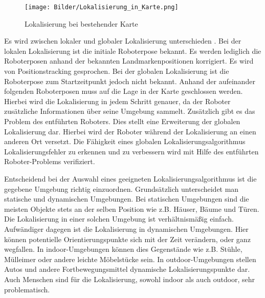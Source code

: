 \begin{figure}
	\centering
	\texttt{[image: Bilder/Lokalisierung\_in\_Karte.png]}
	\caption{Lokalisierung bei bestehender Karte}
	\label{fig:Lokalisierung}
\end{figure}

Es wird zwischen lokaler und globaler Lokalisierung unterschieden \cite{thrun2005}. Bei der lokalen Lokalisierung ist die initiale Roboterpose bekannt. Es werden lediglich die Roboterposen anhand der bekannten Landmarkenpositionen korrigiert. Es wird von Positionstracking gesprochen. Bei der globalen Lokalisierung ist die Roboterpose zum Startzeitpunkt jedoch nicht bekannt. Anhand der aufeinander folgenden Roboterposen muss auf die Lage in der Karte geschlossen werden. Hierbei wird die Lokalisierung in jedem Schritt genauer, da der Roboter zusätzliche Informationen über seine Umgebung sammelt. Zusätzlich gibt es das Problem des entführten Roboters. Dies stellt eine Erweiterung der globalen Lokalisierung dar. Hierbei wird der Roboter während der Lokalisierung an einen anderen Ort versetzt. Die Fähigkeit eines globalen Lokalisierungsalgorithmus Lokalisierungsfehler zu erkennen und zu verbessern wird mit Hilfe des entführten Roboter-Problems verifiziert. 

%

Entscheidend bei der Auswahl eines geeigneten Lokalisierungsalgorithmus ist die gegebene Umgebung richtig einzuordnen. Grundsätzlich unterscheidet man statische und dynamischen Umgebungen. Bei statischen Umgebungen sind die meisten Objekte stets an der selben Position wie z.B. Häuser, Bäume und Türen. Die Lokalisierung in einer solchen Umgebung ist verhältnismäßig einfach. Aufwändiger dagegen ist die Lokalisierung in dynamischen Umgebungen. Hier können potentielle Orientierungspunkte sich mit der Zeit verändern, oder ganz wegfallen. In indoor-Umgebungen können dies Gegenstände wie z.B. Stühle, Mülleimer oder andere leichte Möbelstücke sein. In outdoor-Umgebungen stellen Autos und andere Fortbewegungsmittel dynamische Lokalisierungspunkte dar. Auch Menschen sind für die Lokalisierung, sowohl indoor als auch outdoor, sehr problematisch.

